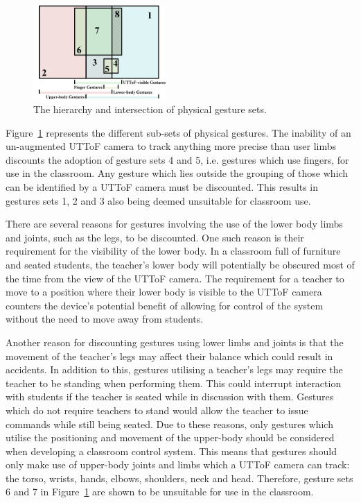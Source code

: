 \documentclass[manuscript, review, screen]{acmart}
\begin{document}
\begin{figure}[t]
   \centering
   \includegraphics[width=0.45\textwidth]{figures/gestures_venn_diagram.png}
   \caption{The hierarchy and intersection of physical gesture sets.}
   \label{fig:gestureVenn}
\end{figure}

Figure~\ref{fig:gestureVenn} represents the different sub-sets of physical gestures.
The inability of an un-augmented \ac{UTToF} camera to track anything more precise than user limbs discounts the adoption of gesture sets 4 and 5, i.e. gestures which use fingers, for use in the classroom.
Any gesture which lies outside the grouping of those which can be identified by a \ac{UTToF} camera must be discounted.
This results in gestures sets 1, 2 and 3 also being deemed unsuitable for classroom use.

There are several reasons for gestures involving the use of the lower body limbs and joints, such as the legs, to be discounted.
One such reason is their requirement for the visibility of the lower body.
In a classroom full of furniture and seated students, the teacher's lower body will potentially be obscured most of the time from the view of the \ac{UTToF} camera.
The requirement for a teacher to move to a position where their lower body is visible to the \ac{UTToF} camera counters the device's potential benefit of allowing for control of the system without the need to move away from students.

Another reason for discounting gestures using lower limbs and joints is that the movement of the teacher's legs may affect their balance which could result in accidents.
In addition to this, gestures utilising a teacher's legs may require the teacher to be standing when performing them.
This could interrupt interaction with students if the teacher is seated while in discussion with them.
Gestures which do not require teachers to stand would allow the teacher to issue commands while still being seated.
Due to these reasons, only gestures which utilise the positioning and movement of the upper-body should be considered when developing a classroom control system.
This means that gestures should only make use of upper-body joints and limbs which a \ac{UTToF} camera can track: the torso, wrists, hands, elbows, shoulders, neck and head.
Therefore, gesture sets 6 and 7 in Figure~\ref{fig:gestureVenn} are shown to be unsuitable for use in the classroom.
\end{document}

